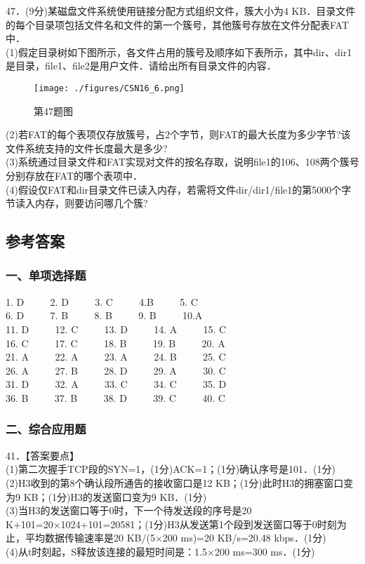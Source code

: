 47．(9分)某磁盘文件系统使用链接分配方式组织文件，簇大小为4 KB．目录文件的每个目录项包括文件名和文件的第一个簇号，其他簇号存放在文件分配表FAT中． \\
(1)假定目录树如下图所示，各文件占用的簇号及顺序如下表所示，其中dir、dir1是目录，file1、file2是用户文件．请给出所有目录文件的内容． \\
\begin{figure}[ht]
\centering
\texttt{[image: ./figures/CSN16\_6.png]}
\caption{第47题图} \label{CSN16_fig6}
\end{figure}
(2)若FAT的每个表项仅存放簇号，占2个字节，则FAT的最大长度为多少字节?该文件系统支持的文件长度最大是多少? \\
(3)系统通过目录文件和FAT实现对文件的按名存取，说明file1的106、108两个簇号分别存放在FAT的哪个表项中． \\
(4)假设仅FAT和dir目录文件已读入内存，若需将文件dir/dir1/file1的第5000个字节读入内存，则要访问哪几个簇?

\subsection{参考答案}
\subsubsection{一、单项选择题}
1. D  $\qquad$ 2. D $\qquad$ 3. C $\qquad$ 4.B $\qquad$ 5. C \\
6. D $\qquad$ 7. B $\qquad$ 8. B $\qquad$ 9. B $\qquad$ 10.A \\
11. D $\qquad$ 12. C $\qquad$ 13. D $\qquad$ 14. A $\qquad$ 15. C \\
16. C $\qquad$ 17. C $\qquad$ 18. B $\qquad$ 19. B $\qquad$ 20. A \\
21. A $\qquad$ 22. A $\qquad$ 23. A $\qquad$ 24. B $\qquad$ 25. C \\
26. A $\qquad$ 27. B $\qquad$ 28. D $\qquad$ 29. A $\qquad$ 30. C \\
31. D $\qquad$ 32. A $\qquad$ 33. C $\qquad$ 34. C $\qquad$ 35. D \\
36. B $\qquad$ 37. B $\qquad$ 38. D $\qquad$ 39. C $\qquad$ 40. C

\subsubsection{二、综合应用题}
41．【答案要点】 \\
(1)第二次握手TCP段的SYN=1，(1分)ACK=1；(1分)确认序号是101．(1分) \\
(2)H3收到的第8个确认段所通告的接收窗口是12 KB；(1分)此时H3的拥塞窗口变为9 KB；(1分)H3的发送窗口变为9 KB．(1分) \\
(3)当H3的发送窗口等于0时，下一个待发送段的序号是20 K+101=20×1024+101=20581；(1分)H3从发送第1个段到发送窗口等于0时刻为止，平均数据传输速率是20 KB/(5×200 ms)=20 KB/s=20.48 kbps．(1分) \\
(4)从t时刻起，S释放该连接的最短时间是：1.5×200 ms=300 ms．(1分)

